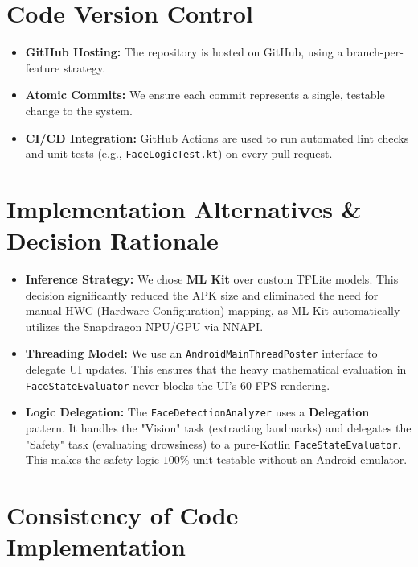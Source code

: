 \documentclass[11pt]{report}
\begin{document}
\section{Code Version Control}\label{sec:version-control}
\begin{itemize}
    \item \textbf{GitHub Hosting:} The repository is hosted on GitHub, using a branch-per-feature strategy.
    \item \textbf{Atomic Commits:} We ensure each commit represents a single, testable change to the system.
    \item \textbf{CI/CD Integration:} GitHub Actions are used to run automated lint checks and unit tests (e.g., \texttt{FaceLogicTest.kt}) on every pull request.
\end{itemize}

\section{Implementation Alternatives \& Decision Rationale}\label{sec:impl-alternatives}

\begin{itemize}
    \item \textbf{Inference Strategy:} We chose \textbf{ML Kit} over custom TFLite models. This decision significantly reduced the APK size and eliminated the need for manual HWC (Hardware Configuration) mapping, as ML Kit automatically utilizes the Snapdragon NPU/GPU via NNAPI.
    \item \textbf{Threading Model:} We use an \texttt{AndroidMainThreadPoster} interface to delegate UI updates. This ensures that the heavy mathematical evaluation in \texttt{FaceStateEvaluator} never blocks the UI's 60 FPS rendering.
    \item \textbf{Logic Delegation:} The \texttt{FaceDetectionAnalyzer} uses a \textbf{Delegation} pattern. It handles the "Vision" task (extracting landmarks) and delegates the "Safety" task (evaluating drowsiness) to a pure-Kotlin \texttt{FaceStateEvaluator}. This makes the safety logic $100\%$ unit-testable without an Android emulator.
\end{itemize}

\section{Consistency of Code Implementation}\label{sec:patterns-consistency}
\end{document}
